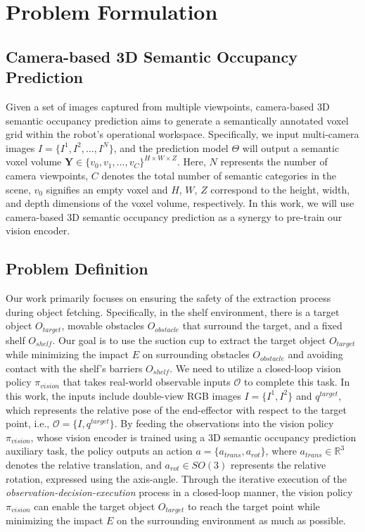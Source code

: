\section{Problem Formulation}
\label{formulation}
\subsection{Camera-based 3D Semantic Occupancy Prediction}
Given a set of images captured from multiple viewpoints, camera-based 3D semantic occupancy prediction aims to generate a semantically annotated voxel grid within the robot’s operational workspace. Specifically, we input multi-camera images $I = \{I^1, I^2, \dots, I^N\}$, and the prediction model $\Theta$ will output a semantic voxel volume $\mathbf{Y} \in \{v_0, v_1, \dots, v_C\}^{H \times W \times Z}$. Here, $N$ represents the number of camera viewpoints, $C$ denotes the total number of semantic categories in the scene, $v_0$ signifies an empty voxel and $H$, $W$, $Z$ correspond to the height, width, and depth dimensions of the voxel volume, respectively. In this work, we will use camera-based 3D semantic occupancy prediction as a synergy to pre-train our vision encoder.
\subsection{Problem Definition}
Our work primarily focuses on ensuring the safety of the extraction process during object fetching. Specifically, in the shelf environment, there is a target object $O_{target}$, movable obstacles $O_{obstacle}$ that surround the target, and a fixed shelf $O_{shelf}$. Our goal is to use the suction cup to extract the target object $O_{target}$ while minimizing the impact $E$ on surrounding obstacles $O_{obstacle}$ and avoiding contact with the shelf’s barriers $O_{shelf}$. We need to utilize a closed-loop vision policy $\pi_{vision}$ that takes real-world observable inputs $\mathcal{O}$ to complete this task. In this work, the inputs include double-view RGB images $I = \{ I^{1}, I^{2} \}$ and $q^{target}$, which represents the relative pose of the end-effector with respect to the target point, i.e., $\mathcal{O} = \{I, q^{target}\}$. By feeding the observations into the vision policy $\pi_{vision}$, whose vision encoder is trained using a 3D semantic occupancy prediction auxiliary task, the policy outputs an action $a = \{a_{trans}, a_{rot}\}$, where $a_{trans} \in \mathbb{R}^{3}$ denotes the relative translation, and $a_{{rot}} \in SO(3)$ represents the relative rotation, expressed using the axis-angle. Through the iterative execution of the \textit{observation-decision-execution} process in a closed-loop manner, the vision policy $\pi_{vision}$ can enable the target object $O_{target}$ to reach the target point while minimizing the impact $E$ on the surrounding environment as much as possible.



